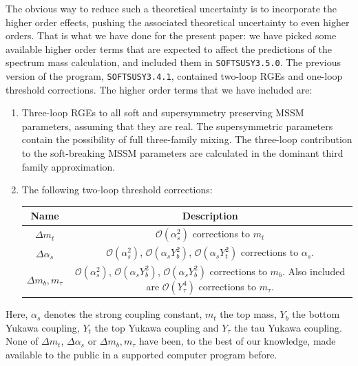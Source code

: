\documentclass[final,3p,times,pdflatex]{elsarticle}
\begin{document}
The obvious way to reduce such a theoretical uncertainty is to incorporate the
higher order effects, pushing the associated theoretical uncertainty to even
higher orders.
That is what we have done for the present paper: we have
picked some available higher order terms that are expected to affect the
predictions of the spectrum mass calculation, and included them in
{\tt SOFTSUSY3.5.0}. The previous version of the program, {\tt SOFTSUSY3.4.1}, 
contained two-loop RGEs and one-loop threshold corrections. 
The higher order terms that we have included are: 
\begin{enumerate}
\item
Three-loop RGEs to all soft and supersymmetry preserving MSSM parameters, 
assuming that they are real. The supersymmetric parameters contain the
possibility of full three-family mixing. The three-loop contribution to the 
soft-breaking MSSM parameters are calculated in the dominant third family
approximation. 
\item
The following two-loop threshold corrections:
\begin{center}
\begin{tabular}{|c|c|}\hline
Name & Description \\ \hline
$\Delta m_t$ & $\mathcal O(\alpha_s^2)$ corrections to $m_t$ \\
 $\Delta \alpha_s$ & $\mathcal O(\alpha_s^2)$, $\mathcal O(\alpha_s Y_b^2)$,
 $\mathcal O(\alpha_s 
 Y_t^2)$ corrections to $\alpha_s$. \\
 $\Delta m_b, m_\tau$ & $\mathcal O(\alpha_s^2)$, $\mathcal O(\alpha_s Y_b^2)$, $\mathcal O(\alpha_s
 Y_b^2)$ corrections to $m_b$. Also included are $\mathcal O(Y_\tau^4)$
 corrections to $m_\tau$. \\
\hline \end{tabular}
\end{center}
\end{enumerate}
Here, $\alpha_s$ denotes the strong coupling constant, $m_t$ the top mass,
$Y_b$ the bottom Yukawa coupling, $Y_t$ the top Yukawa coupling and $Y_\tau$
the tau Yukawa coupling. 
None of $\Delta m_t$, $\Delta \alpha_s$ or $\Delta m_b, m_\tau$ have been, to
the best of our knowledge, made available to the public in a supported
computer program before. 
\end{document}
